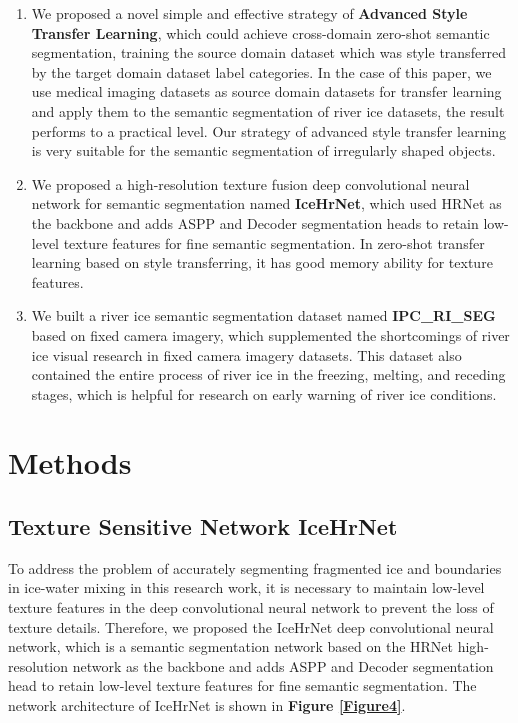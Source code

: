 \documentclass[a4paper,fleqn]{cas-dc}
\begin{document}
\begin{enumerate}
\item We proposed a novel simple and effective strategy of \textbf{Advanced Style Transfer Learning}, which could achieve cross-domain zero-shot semantic segmentation, training the source domain dataset which was style transferred by the target domain dataset label categories. In the case of this paper, we use medical imaging datasets as source domain datasets for transfer learning and apply them to the semantic segmentation of river ice datasets, the result performs to a practical level. Our strategy of advanced style transfer learning is very suitable for the semantic segmentation of irregularly shaped objects.
\item We proposed a high-resolution texture fusion deep convolutional neural network for semantic segmentation named \textbf{IceHrNet}, which used HRNet as the backbone and adds ASPP and Decoder segmentation heads to retain low-level texture features for fine semantic segmentation. In zero-shot transfer learning based on style transferring, it has good memory ability for texture features.
\item We built a river ice semantic segmentation dataset named \textbf{IPC\_RI\_SEG} based on fixed camera imagery, which supplemented the shortcomings of river ice visual research in fixed camera imagery datasets. This dataset also contained the entire process of river ice in the freezing, melting, and receding stages, which is helpful for research on early warning of river ice conditions.
\end{enumerate}  

\section{Methods}
\subsection{Texture Sensitive Network IceHrNet}

To address the problem of accurately segmenting fragmented ice and boundaries in ice-water mixing in this research work, it is necessary to maintain low-level texture features in the deep convolutional neural network to prevent the loss of texture details. Therefore, we proposed the IceHrNet deep convolutional neural network, which is a semantic segmentation network based on the HRNet \cite{Sun_Xiao_Liu_Wang_2019} high-resolution network as the backbone and adds ASPP \cite{Chen_Zhu_Papandreou_Schroff_Adam_2018} and Decoder segmentation head to retain low-level texture features for fine semantic segmentation. The network architecture of IceHrNet is shown in \textbf{Figure \ref{Figure4}}.
\end{document}

